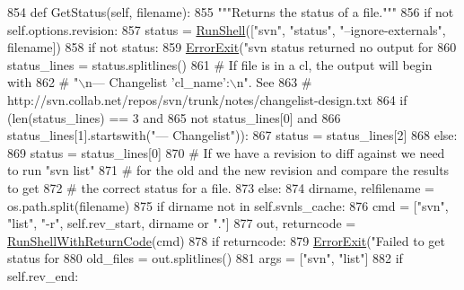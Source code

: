 \begin{DoxyCode}
854   \textcolor{keyword}{def }GetStatus(self, filename):
855     \textcolor{stringliteral}{"""Returns the status of a file."""}
856     \textcolor{keywordflow}{if} \textcolor{keywordflow}{not} self.options.revision:
857       status = \hyperlink{namespaceupload_adddc423c49132e8879cbb25d6be2cf11}{RunShell}([\textcolor{stringliteral}{"svn"}, \textcolor{stringliteral}{"status"}, \textcolor{stringliteral}{"--ignore-externals"}, filename])
858       \textcolor{keywordflow}{if} \textcolor{keywordflow}{not} status:
859         \hyperlink{namespaceupload_adea53186a1d73e92cc839b7c35c2c044}{ErrorExit}(\textcolor{stringliteral}{"svn status returned no output for %
860       status\_lines = status.splitlines()
861       \textcolor{comment}{# If file is in a cl, the output will begin with}
862       \textcolor{comment}{# "\(\backslash\)n--- Changelist 'cl\_name':\(\backslash\)n".  See}
863       \textcolor{comment}{# http://svn.collab.net/repos/svn/trunk/notes/changelist-design.txt}
864       \textcolor{keywordflow}{if} (len(status\_lines) == 3 \textcolor{keywordflow}{and}
865           \textcolor{keywordflow}{not} status\_lines[0] \textcolor{keywordflow}{and}
866           status\_lines[1].startswith(\textcolor{stringliteral}{"--- Changelist"})):
867         status = status\_lines[2]
868       \textcolor{keywordflow}{else}:
869         status = status\_lines[0]
870     \textcolor{comment}{# If we have a revision to diff against we need to run "svn list"}
871     \textcolor{comment}{# for the old and the new revision and compare the results to get}
872     \textcolor{comment}{# the correct status for a file.}
873     \textcolor{keywordflow}{else}:
874       dirname, relfilename = os.path.split(filename)
875       \textcolor{keywordflow}{if} dirname \textcolor{keywordflow}{not} \textcolor{keywordflow}{in} self.svnls\_cache:
876         cmd = [\textcolor{stringliteral}{"svn"}, \textcolor{stringliteral}{"list"}, \textcolor{stringliteral}{"-r"}, self.rev\_start, dirname \textcolor{keywordflow}{or} \textcolor{stringliteral}{"."}]
877         out, returncode = \hyperlink{namespaceupload_afa542d3a5a4f4fce174a1c23644a9204}{RunShellWithReturnCode}(cmd)
878         \textcolor{keywordflow}{if} returncode:
879           \hyperlink{namespaceupload_adea53186a1d73e92cc839b7c35c2c044}{ErrorExit}(\textcolor{stringliteral}{"Failed to get status for %
880         old\_files = out.splitlines()
881         args = [\textcolor{stringliteral}{"svn"}, \textcolor{stringliteral}{"list"}]
882         \textcolor{keywordflow}{if} self.rev\_end:
}}
\end{DoxyCode}
